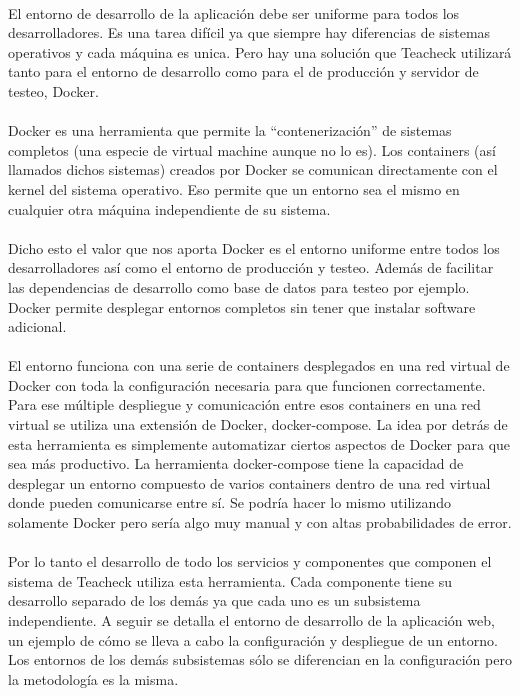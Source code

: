 \paragraph{}
El entorno de desarrollo de la aplicación debe ser uniforme para todos los desarrolladores. Es una tarea difícil ya que siempre hay diferencias de sistemas operativos y cada máquina es unica. Pero hay una solución que Teacheck utilizará tanto para el entorno de desarrollo como para el de producción y servidor de testeo, Docker.

\paragraph{}
Docker es una herramienta que permite la “contenerización” de sistemas completos (una especie de virtual machine aunque no lo es). Los containers (así llamados dichos sistemas) creados por Docker se comunican directamente con el kernel del sistema operativo. Eso permite que un entorno sea el mismo en cualquier otra máquina independiente de su sistema.

\paragraph{}
Dicho esto el valor que nos aporta Docker es el entorno uniforme entre todos los desarrolladores así como el entorno de producción y testeo. Además de facilitar las dependencias de desarrollo como base de datos para testeo por ejemplo. Docker permite desplegar entornos completos sin tener que instalar software adicional.

\paragraph{}
El entorno funciona con una serie de containers desplegados en una red virtual de Docker con toda la configuración necesaria para que funcionen correctamente. Para ese múltiple despliegue y comunicación entre esos containers en una red virtual se utiliza una extensión de Docker, docker-compose. La idea por detrás de esta herramienta es simplemente automatizar ciertos aspectos de Docker para que sea más productivo. La herramienta docker-compose tiene la capacidad de desplegar un entorno compuesto de varios containers dentro de una red virtual donde pueden comunicarse entre sí. Se podría hacer lo mismo utilizando solamente Docker pero sería algo muy manual y con altas probabilidades de error.

\paragraph{}
Por lo tanto el desarrollo de todo los servicios y componentes que componen el sistema de Teacheck utiliza esta herramienta. Cada componente tiene su desarrollo separado de los demás ya que cada uno es un subsistema independiente. A seguir se detalla el entorno de desarrollo de la aplicación web, un ejemplo de cómo se lleva a cabo la configuración y despliegue de un entorno. Los entornos de los demás subsistemas sólo se diferencian en la configuración pero la metodología es la misma. 

